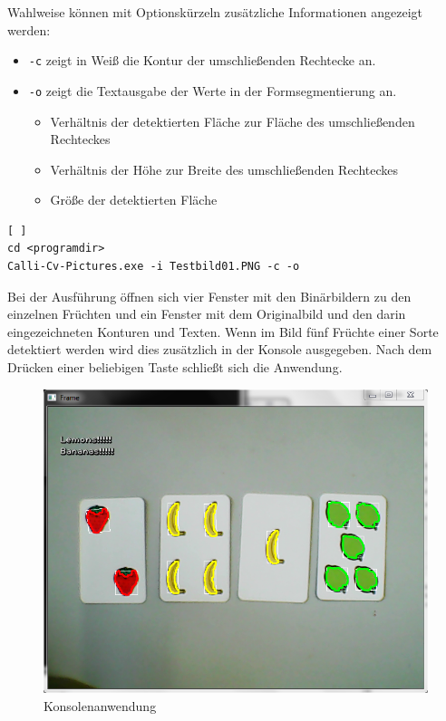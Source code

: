 Wahlweise können mit Optionskürzeln zusätzliche Informationen angezeigt werden:
\begin{itemize}
\item \lstinline{-c} zeigt in Weiß die Kontur der umschließenden Rechtecke an.
\item \lstinline{-o} zeigt die Textausgabe der Werte in der Formsegmentierung an.
\begin{itemize}
\item Verhältnis der detektierten Fläche zur Fläche des umschließenden Rechteckes
\item Verhältnis der Höhe zur Breite des umschließenden Rechteckes
\item Größe der detektierten Fläche
\end{itemize}
\end{itemize}

\begin{singlespace}
\begin{lstlisting}[ ]
cd <programdir>
Calli-Cv-Pictures.exe -i Testbild01.PNG -c -o
\end{lstlisting}
\end{singlespace}
Bei der Ausführung öffnen sich vier Fenster mit den Binärbildern zu den einzelnen Früchten und ein Fenster mit dem Originalbild und den darin eingezeichneten Konturen und Texten.
Wenn im Bild fünf Früchte einer Sorte detektiert werden wird dies zusätzlich in der Konsole ausgegeben.
Nach dem Drücken einer beliebigen Taste schließt sich die Anwendung.
\begin{figure}[H]
    \centering
    \includegraphics[width=15cm]{Abbildungen/Calli-Konsole}
    \caption[Konsole]{Konsolenanwendung}
    \label{fig:Konsole}
\end{figure}


